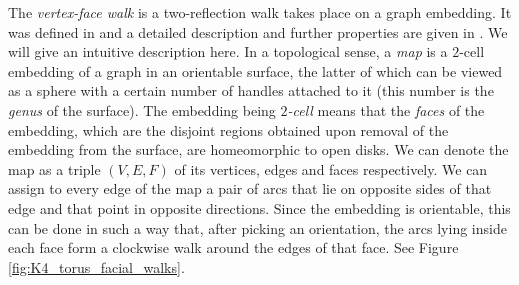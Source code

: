 \documentclass{article}
\numberwithin{equation}{section}
\begin{document}
The \textsl{vertex-face walk} is a two-reflection walk takes place on a graph embedding. It was defined in \cite{Zha2021} and a detailed description and further properties are given in \cite{GuoSch2024}. We will give an intuitive description here. In a topological sense, a \textsl{map} is a $2$-cell embedding of a graph in an orientable surface, the latter of which can be viewed as a sphere with a certain number of handles attached to it (this number is the \textsl{genus} of the surface). The embedding being \textsl{$2$-cell} means that the \textsl{faces} of the embedding, which are the disjoint regions obtained upon removal of the embedding from the surface, are homeomorphic to open disks. We can denote the map as a triple $(V,E,F)$ of its vertices, edges and faces respectively. We can assign to every edge of the map a pair of arcs that lie on opposite sides of that edge and that point in opposite directions. Since the embedding is orientable, this can be done in such a way that, after picking an orientation, the arcs lying inside each face form a clockwise walk around the edges of that face. See Figure \ref{fig:K4_torus_facial_walks}.
\end{document}
